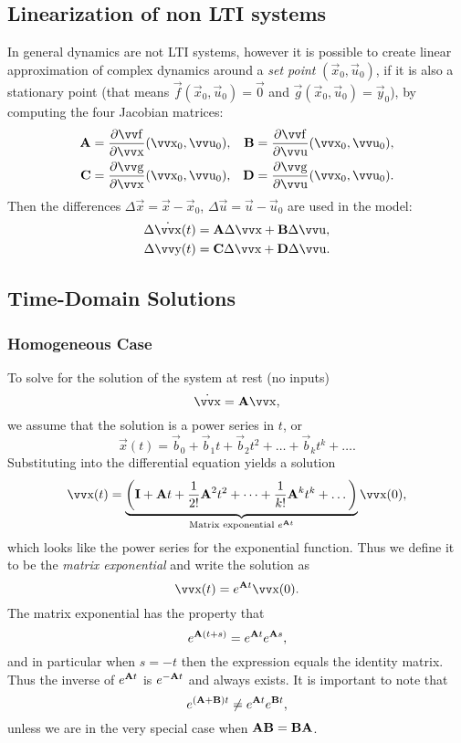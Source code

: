 \subsection{Linearization of non LTI systems}

In general dynamics are not LTI systems, however it is possible to create linear approximation of complex dynamics around a \emph{set point} \((\vec{x}_0, \vec{u}_0)\), if it is also a stationary point (that means \(\vec{f}(\vec{x}_0, \vec{u}_0) = \vec{0}\) and \(\vec{g}(\vec{x}_0, \vec{u}_0) = \vec{y}_0\)), by computing the four Jacobian matrices:
\begin{align*}
	\mx{A} &= \frac{\partial\vec{f}}{\partial\vec{x}} (\vec{x}_0, \vec{u}_0), &
	\mx{B} &= \frac{\partial\vec{f}}{\partial\vec{u}} (\vec{x}_0, \vec{u}_0), \\
	\mx{C} &= \frac{\partial\vec{g}}{\partial\vec{x}} (\vec{x}_0, \vec{u}_0), &
	\mx{D} &= \frac{\partial\vec{g}}{\partial\vec{u}} (\vec{x}_0, \vec{u}_0).
\end{align*}
Then the differences \(\Delta\vec{x} = \vec{x} - \vec{x}_0\), \(\Delta\vec{u} = \vec{u} - \vec{u}_0\) are used in the model:
\begin{align*}
	\Delta\dot{\vec{x}}(t) & = \mx{A} \Delta\vec{x} + \mx{B} \Delta\vec{u}, \\
	\Delta\vec{y}(t)       & = \mx{C} \Delta\vec{x} + \mx{D} \Delta\vec{u}.
\end{align*}

\subsection{Time-Domain Solutions}

\subsubsection{Homogeneous Case}

To solve for the solution of the system at rest (no inputs)
\[
	\dot{\vec{x}} = \mx{A} \vec{x},
\]
we assume that the solution is a power series in \(t\), or
\[
	\vec{x}(t) = \vec{b}_0 + \vec{b}_1 t + \vec{b}_2 t^2 + \dots + \vec{b}_k t^k + \dots.
\]
Substituting into the differential equation yields a solution
\[
	\vec{x}(t) = \underbrace{\left(
		\mx{I} + \mx{A} t + \frac{1}{2!} \mx{A}^2 t^2 + \dots
		+ \frac{1}{k!} \mx{A}^k t^k + \dots
	\right)}_{\text{Matrix exponential } e^{\mx{A}t}} \vec{x}(0),
\]
which looks like the power series for the exponential function. Thus we define it to be the \emph{matrix exponential} and write the solution as
\[
	\vec{x}(t) = e^{\mx{A}t} \vec{x}(0).
\]
The matrix exponential has the property that
\[
	e^{\bm{\mathrm{A}}(t + s)} = e^{\bm{\mathrm{A}}t} e^{\bm{\mathrm{A}}s},
\]
and in particular when \(s = -t\) then the expression equals the identity matrix. Thus the inverse of \(e^{\bm{\mathrm{A}}t}\) is \(e^{-\bm{\mathrm{A}}t}\) and always exists. It is important to note that
\[
	e^{(\bm{\mathrm{A}} + \bm{\mathrm{B}}) t} \neq e^{\bm{\mathrm{A}}t} e^{\bm{\mathrm{B}}t},
\]
unless we are in the very special case when \(\bm{\mathrm{A}}\bm{\mathrm{B}} = \bm{\mathrm{B}}\bm{\mathrm{A}}\).

